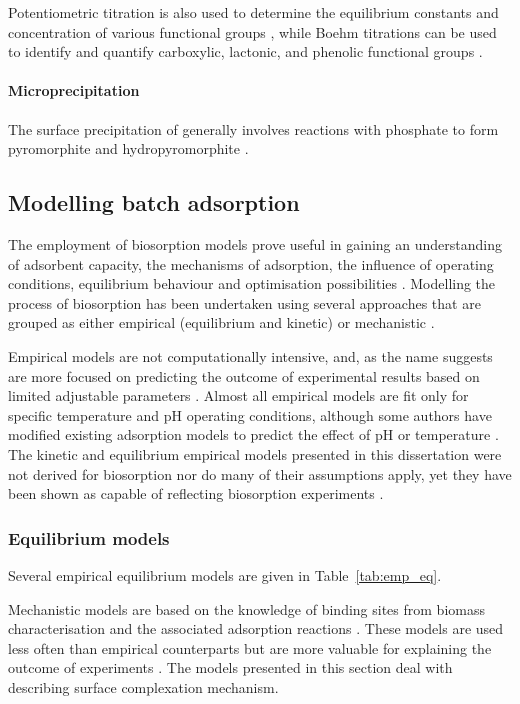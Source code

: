 Potentiometric titration is also used to determine the equilibrium constants and concentration of various functional groups \parencite{Turner2005}, while Boehm titrations can be used to identify and quantify carboxylic, lactonic, and phenolic functional groups \parencite{SeungKim2016}.

\paragraph{Microprecipitation}  The surface precipitation of  generally involves reactions with phosphate to form pyromorphite and  hydropyromorphite \parencite{Li2017}.

\subsection{Modelling batch adsorption}

The employment of biosorption models prove useful in gaining an understanding of adsorbent capacity, the mechanisms of adsorption, the influence of operating conditions, equilibrium behaviour and optimisation possibilities \parencite{Anastopoulos2015,Unuabonah2019}. Modelling the process of biosorption has been undertaken using several approaches that are grouped as either empirical (equilibrium and kinetic) or mechanistic \parencite{Chen2006}. 

Empirical models  are not computationally intensive, and, as the name suggests are more focused on predicting the outcome of experimental results based on limited adjustable parameters \parencite{Vijayaraghavan2008}. Almost all empirical models are fit only  for specific temperature and pH operating conditions, although some authors have modified existing adsorption models to predict the effect of pH or temperature \parencite{Esposito2002,Jeppu2012}. The kinetic and equilibrium empirical models presented in this dissertation were not derived for biosorption nor do many of their assumptions apply, yet they have been shown as capable of reflecting biosorption experiments \parencite{Vijayaraghavan2008}.  

\subsubsection{Equilibrium models} 

Several empirical equilibrium models are given in Table~\ref{tab:emp_eq}.

Mechanistic models are based on the knowledge of binding sites from biomass characterisation and the associated adsorption reactions \parencite{Vijayaraghavan2008}. These models are used less often than empirical counterparts but are more valuable for explaining the outcome of experiments \parencite{Unuabonah2019}. The models presented in this section deal with describing surface complexation mechanism.

